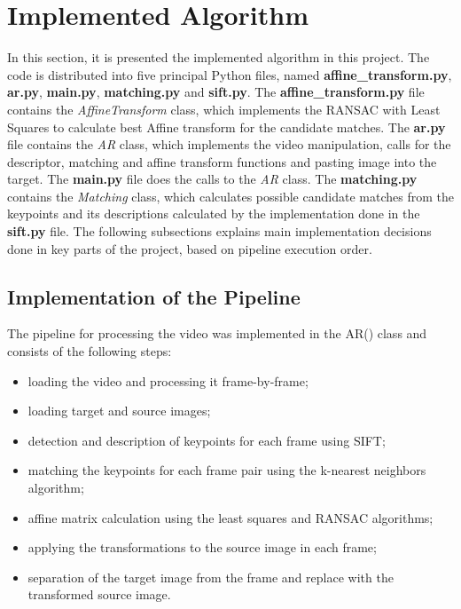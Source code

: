 \documentclass[]{IEEEtran}
\begin{document}
\section{Implemented Algorithm}
In this section, it is presented the implemented algorithm in this project. The code is distributed into five principal Python files, named \textbf{affine\_transform.py}, \textbf{ar.py}, \textbf{main.py}, \textbf{matching.py} and \textbf{sift.py}. The \textbf{affine\_transform.py} file contains the \textit{AffineTransform} class, which implements the RANSAC with Least Squares to calculate best Affine transform for the candidate matches. The \textbf{ar.py} file contains the \textit{AR} class, which implements the video manipulation, calls for the descriptor, matching and affine transform functions and pasting image into the target. The \textbf{main.py} file does the calls to the \textit{AR} class. The \textbf{matching.py} contains the \textit{Matching} class, which calculates possible candidate matches from the keypoints and its descriptions calculated by the implementation done in the \textbf{sift.py} file. The following subsections explains main implementation decisions done in key parts of the project, based on pipeline execution order.


\subsection{Implementation of the Pipeline}

The pipeline for processing the video was implemented in the AR() class and consists of the following steps:

\begin{itemize}
  \item loading the video and processing it frame-by-frame;
  \item loading target and source images;
  \item detection and description of keypoints for each frame using SIFT;
  \item matching the keypoints for each frame pair using the k-nearest neighbors algorithm;
  \item affine matrix calculation using the least squares and RANSAC algorithms;
  \item applying the transformations to the source image in each frame;
  \item separation of the target image from the frame and replace with the transformed source image. 
\end{itemize}
\end{document}
